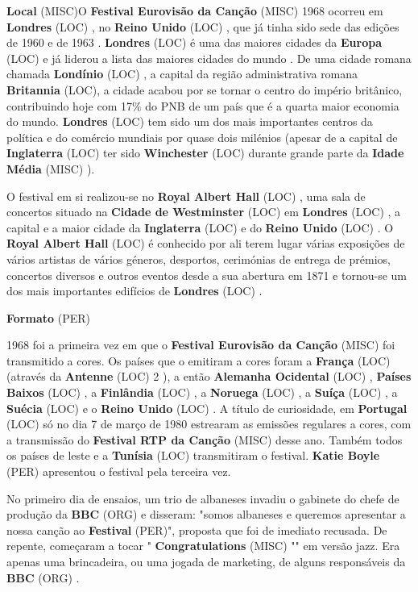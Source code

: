 \documentclass[12pt,a4paper]{article}
\begin{document}
\textbf{Local} (MISC)O \textbf{Festival Eurovisão da Canção} (MISC) 1968 ocorreu em \textbf{Londres} (LOC) , no \textbf{Reino Unido} (LOC) , que já tinha sido sede das edições de 1960 e de 1963 . \textbf{Londres} (LOC) é uma das maiores cidades da \textbf{Europa} (LOC) e já liderou a lista das maiores cidades do mundo . De uma cidade romana chamada \textbf{Londínio} (LOC) , a capital da região administrativa romana \textbf{Britannia} (LOC), a cidade acabou por se tornar o centro do império britânico, contribuindo hoje com 17\% do PNB de um país que é a quarta maior economia do mundo. \textbf{Londres} (LOC) tem sido um dos mais importantes centros da política e do comércio mundiais por quase dois milénios (apesar de a capital de \textbf{Inglaterra} (LOC) ter sido \textbf{Winchester} (LOC) durante grande parte da \textbf{Idade Média} (MISC) ).

O festival em si realizou-se no \textbf{Royal Albert Hall} (LOC) , uma sala de concertos situado na \textbf{Cidade de Westminster} (LOC) em \textbf{Londres} (LOC) , a capital e a maior cidade da \textbf{Inglaterra} (LOC) e do \textbf{Reino Unido} (LOC) . O \textbf{Royal Albert Hall} (LOC) é conhecido por ali terem lugar várias exposições de vários artistas de vários géneros, desportos, cerimónias de entrega de prémios, concertos diversos e outros eventos desde a sua abertura em 1871 e tornou-se um dos mais importantes edifícios de \textbf{Londres} (LOC) .



\textbf{Formato} (PER)

1968 foi a primeira vez em que o \textbf{Festival Eurovisão da Canção} (MISC) foi transmitido a cores. Os países que o emitiram a cores foram a \textbf{França} (LOC) (através da \textbf{Antenne} (LOC) 2 ), a então \textbf{Alemanha Ocidental} (LOC) , \textbf{Países Baixos} (LOC) , a \textbf{Finlândia} (LOC) , a \textbf{Noruega} (LOC) , a \textbf{Suíça} (LOC) , a \textbf{Suécia} (LOC) e o \textbf{Reino Unido} (LOC) . A título de curiosidade, em \textbf{Portugal} (LOC) só no dia 7 de março de 1980 estrearam as emissões regulares a cores, com a transmissão do \textbf{Festival RTP da Canção} (MISC) desse ano. Também todos os países de leste e a \textbf{Tunísia} (LOC) transmitiram o festival. \textbf{Katie Boyle} (PER) apresentou o festival pela terceira vez.

No primeiro dia de ensaios, um trio de albaneses invadiu o gabinete do chefe de produção da \textbf{BBC} (ORG) e disseram: "somos albaneses e queremos apresentar a nossa canção ao \textbf{Festival} (PER)", proposta que foi de imediato recusada. De repente, começaram a tocar " \textbf{Congratulations} (MISC) "" em versão jazz. Era apenas uma brincadeira, ou uma jogada de marketing, de alguns responsáveis da \textbf{BBC} (ORG) .
\end{document}
